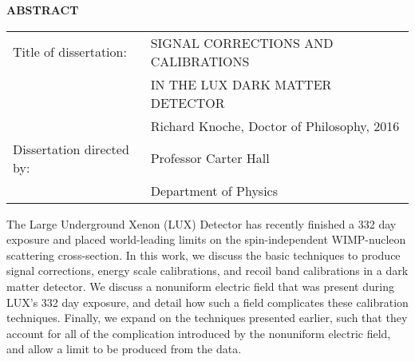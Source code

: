 \thispagestyle{plain}
\begin{center}
    \Large
    \textbf{ABSTRACT}
    
    \vspace{1cm}
    \large
    \begin{tabular}{ll}
  	Title of dissertation:& SIGNAL CORRECTIONS AND CALIBRATIONS \\[-0.5cm]
  	& IN THE LUX DARK MATTER DETECTOR \\[0.3cm]
  	& Richard Knoche, Doctor of Philosophy, 2016 \\[0.2cm]
    Dissertation directed by:& Professor Carter Hall \\[-0.5cm]
    & Department of Physics
 	\end{tabular}

	\vspace{1cm}
    \normalsize

\end{center}
    The Large Underground Xenon (LUX) Detector has recently finished a 332 day exposure and placed world-leading limits on the spin-independent WIMP-nucleon scattering cross-section.  In this work, we discuss the basic techniques to produce signal corrections, energy scale calibrations, and recoil band calibrations in a dark matter detector.  We discuss a nonuniform electric field that was present during LUX's 332 day exposure, and detail how such a field complicates these calibration techniques.  Finally, we expand on the techniques presented earlier, such that they account for all of the complication introduced by the nonuniform electric field, and allow a limit to be produced from the data.

